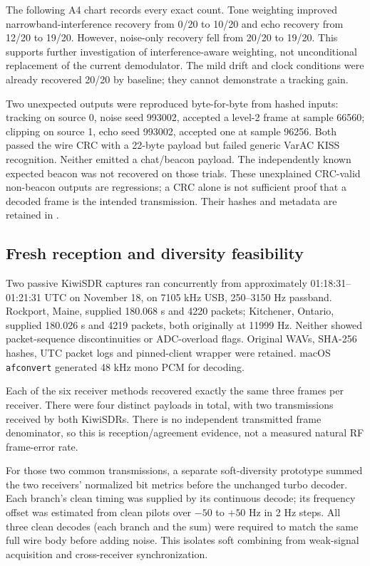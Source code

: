 \documentclass[11pt,a4paper]{article}
\newcommand{\pathtext}[1]{\path{#1}}
\begin{document}
The following A4 chart records every exact count. Tone weighting improved
narrowband-interference recovery from 0/20 to 10/20 and echo recovery from
12/20 to 19/20. However, noise-only recovery fell from 20/20 to 19/20. This
supports further investigation of interference-aware weighting, not unconditional
replacement of the current demodulator. The mild drift and clock conditions
were already recovered 20/20 by baseline; they cannot demonstrate a tracking gain.

Two unexpected outputs were reproduced byte-for-byte from hashed inputs:
tracking on source 0, noise seed 993002, accepted a level-2 frame at sample
66560; clipping on source 1, echo seed 993002, accepted one at sample 96256.
Both passed the wire CRC with a 22-byte payload but failed generic VarAC KISS
recognition. Neither emitted a chat/beacon payload. The independently known
expected beacon was not recovered on those trials. These unexplained
CRC-valid non-beacon outputs are regressions; a CRC alone is not sufficient
proof that a decoded frame is the intended transmission. Their hashes and
metadata are retained in \pathtext{unexpected-adjudication.json}.

\subsection{Fresh reception and diversity feasibility}
Two passive KiwiSDR captures ran concurrently from approximately
01:18:31--01:21:31 UTC on November 18, on 7105 kHz USB, 250--3150 Hz
passband. Rockport, Maine, supplied 180.068 s and 4220 packets; Kitchener,
Ontario, supplied 180.026 s and 4219 packets, both originally at 11999 Hz.
Neither showed packet-sequence discontinuities or ADC-overload flags.
Original WAVs, SHA-256 hashes, UTC packet logs and pinned-client wrapper
were retained. macOS \texttt{afconvert} generated 48 kHz mono PCM for decoding.

Each of the six receiver methods recovered exactly the same three frames
per receiver. There were four distinct payloads in total, with two
transmissions received by both KiwiSDRs. There is no independent transmitted
frame denominator, so this is reception/agreement evidence, not a measured
natural RF frame-error rate.

For those two common transmissions, a separate soft-diversity prototype
summed the two receivers' normalized bit metrics before the unchanged turbo
decoder. Each branch's clean timing was supplied by its continuous decode;
its frequency offset was estimated from clean pilots over $-50$ to $+50$ Hz
in 2 Hz steps. All three clean decodes (each branch and the sum) were required
to match the same full wire body before adding noise. This isolates soft
combining from weak-signal acquisition and cross-receiver synchronization.
\end{document}
